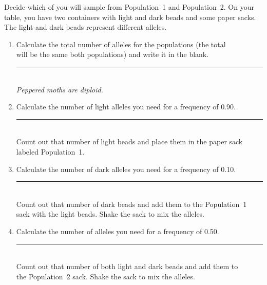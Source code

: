 \documentclass[12pt, hidelinks]{exam}
\begin{document}
\begin{questions}
Decide which of you will sample from Population~1 and Population~2. On your table, you have two containers with light and dark beads and some paper sacks. The light and dark beads represent different alleles.


\begin{enumerate}

	\item Calculate the total number of alleles for the populations (the total \\ 
	will be the same both populations) and write it in the blank. \hfill \rule{0.5in}{0.4pt}\\ \emph{Peppered moths are diploid.} 
	
	\item Calculate the number of light alleles you need for a frequency of 0.90. \hfill \rule{0.5in}{0.4pt} \\ Count out that number of light beads and place them in the paper sack\\ labeled Population~1. 
		
	\item Calculate the number of dark alleles you need for a frequency of 0.10. \hfill \rule{0.5in}{0.4pt} \\ Count out that number of dark beads and add them to the Population~1\\
	 sack with the light beads. Shake the sack to mix the alleles.

	\item Calculate the number of alleles you need for a frequency of 0.50. \hfill \rule{0.5in}{0.4pt} \\ Count out that number of both light and dark beads and add them to \\
	the Population~2 sack. Shake the sack to mix the alleles.


%	
%	


\end{enumerate}
\end{questions}
\end{document}
